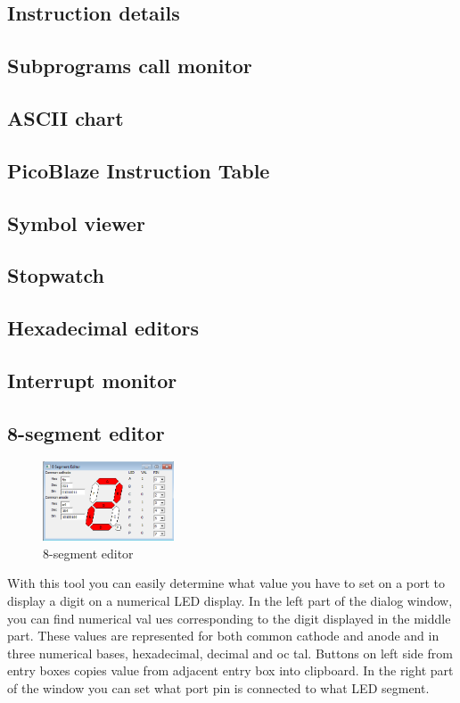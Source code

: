 \subsection{Instruction details}

\subsection{Subprograms call monitor}

\subsection{ASCII chart}

\subsection{PicoBlaze Instruction Table}

\subsection{Symbol viewer}

\subsection{Stopwatch}

\subsection{Hexadecimal editors}

\subsection{Interrupt monitor}

\subsection{8-segment editor}
    \begin{figure}
        \centering{}
        \includegraphics[width=110pt]{img/8segment.png}
        \caption{8-segment editor}
    \end{figure}
    With this tool you can easily determine what value you have to set on a port to display a digit on a numerical LED display. In the left part of the dialog window, you can find numerical val ues corresponding to the digit displayed in the middle part. These values are represented for both common cathode and anode and in three numerical bases, hexadecimal, decimal and oc tal. Buttons on left side from entry boxes copies value from adjacent entry box into clipboard. In the right part of the window you can set what port pin is connected to what LED segment.

